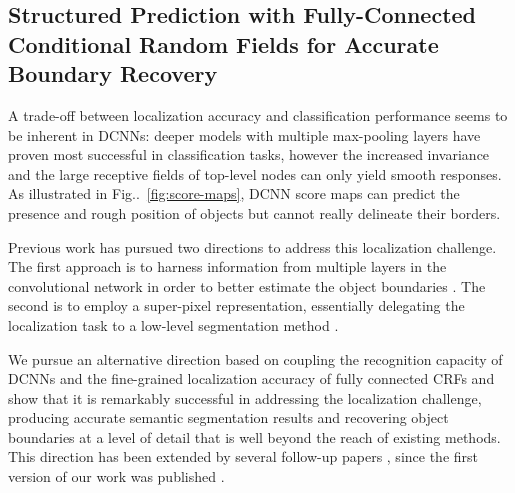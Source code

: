 \documentclass[10pt,journal,compsoc]{IEEEtran}
\makeatletter
\newcommand{\figref}[1]{Fig\onedot~\ref{#1}}
\def\onedot{\ifx\@let@token.\else.\null\fi\xspace}
\makeatother
\begin{document}
\subsection{Structured Prediction with Fully-Connected Conditional Random Fields for Accurate Boundary Recovery}
\label{sec:boundary-recovery}

A trade-off between localization accuracy and classification performance seems to be inherent in DCNNs:
deeper models with multiple max-pooling layers have
proven most successful in classification tasks, however the increased
invariance and the large receptive fields of top-level nodes can only yield smooth responses.
As illustrated in \figref{fig:score-maps}, DCNN score maps can
 predict the presence and rough position of objects but
cannot really delineate their borders. 

Previous work has pursued two directions to address this localization challenge.
The first approach is to harness information from multiple layers in the
convolutional network in order to better estimate the object boundaries
\cite{hariharan2014hypercolumns, long2014fully, eigen2014predicting}. The
second  is to employ a super-pixel representation, essentially
delegating the localization task to a low-level segmentation method
\cite{mostajabi2014feedforward}.





We pursue an alternative direction based on coupling the recognition
capacity of DCNNs and the fine-grained localization accuracy of fully connected
CRFs and show that it is remarkably successful in addressing the localization
challenge, producing accurate semantic segmentation results and recovering
object boundaries at a level of detail that is well beyond the reach of existing
methods. This direction has been extended by several follow-up papers
\cite{papandreou2015weakly, schwing2015fully, zheng2015conditional,
  dai2015boxsup, noh2015learning, liu2015semantic, lin2015efficient,
  chen2015attention, chen2015semantic}, since the first version of our work
was published \cite{chen2014semantic}.
\end{document}
